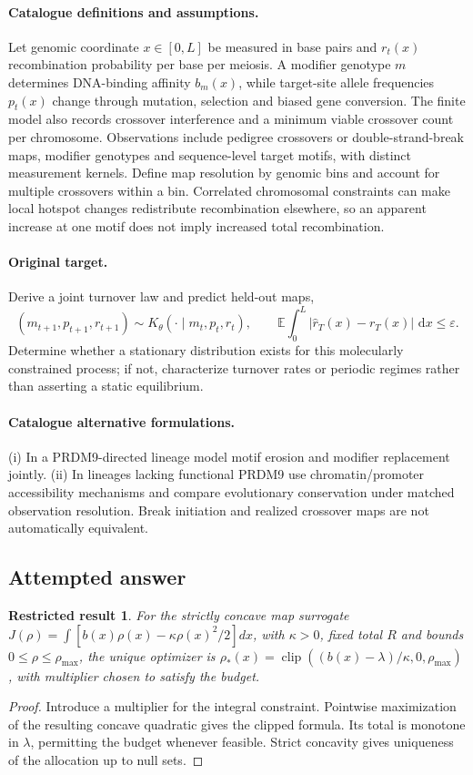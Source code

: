 \documentclass[11pt]{article}
\newcommand{\E}{\mathbb E}
\newcommand{\dd}{\,\mathrm d}
\providecommand{\E}{\mathbb E}
\newtheorem{attemptresult}{Restricted result}[section]
\begin{document}
\paragraph{Catalogue definitions and assumptions.}
Let genomic coordinate $x\in[0,L]$ be measured in base pairs and $r_t(x)$ recombination probability per base per meiosis. A modifier genotype $m$ determines DNA-binding affinity $b_m(x)$, while target-site allele frequencies $p_t(x)$ change through mutation, selection and biased gene conversion. The finite model also records crossover interference and a minimum viable crossover count per chromosome. Observations include pedigree crossovers or double-strand-break maps, modifier genotypes and sequence-level target motifs, with distinct measurement kernels. Define map resolution by genomic bins and account for multiple crossovers within a bin. Correlated chromosomal constraints can make local hotspot changes redistribute recombination elsewhere, so an apparent increase at one motif does not imply increased total recombination.
\paragraph{Original target.}
Derive a joint turnover law and predict held-out maps,
\[
 (m_{t+1},p_{t+1},r_{t+1})\sim
 K_\theta(\cdot\mid m_t,p_t,r_t),\qquad
 \E\!\int_0^L|\widehat r_T(x)-r_T(x)|\,\dd x\le\varepsilon.
\]
Determine whether a stationary distribution exists for this molecularly constrained process; if not, characterize turnover rates or periodic regimes rather than asserting a static equilibrium.
\paragraph{Catalogue alternative formulations.}
(i) In a PRDM9-directed lineage model motif erosion and modifier replacement jointly. (ii) In lineages lacking functional PRDM9 use chromatin/promoter accessibility mechanisms and compare evolutionary conservation under matched observation resolution. Break initiation and realized crossover maps are not automatically equivalent.
\subsection{Attempted answer}
\begin{attemptresult}
For the strictly concave map surrogate $J(\rho)=\int[b(x)\rho(x)-\kappa\rho(x)^2/2]dx$, with $\kappa>0$, fixed total $R$ and bounds $0\leq\rho\leq\rho_{\max}$, the unique optimizer is $\rho_*(x)=\operatorname{clip}((b(x)-\lambda)/\kappa,0,\rho_{\max})$, with multiplier chosen to satisfy the budget.
\end{attemptresult}
\begin{proof}
Introduce a multiplier for the integral constraint. Pointwise maximization of the resulting concave quadratic gives the clipped formula. Its total is monotone in $\lambda$, permitting the budget whenever feasible. Strict concavity gives uniqueness of the allocation up to null sets.
\end{proof}
\end{document}
